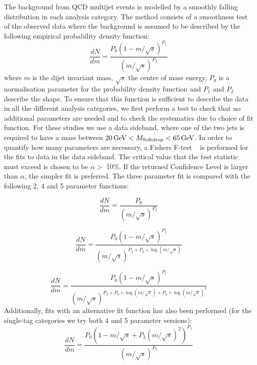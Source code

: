 The background from QCD multijet events is modelled by a smoothly falling distribution in each analysis category. The method consists of a smoothness test of the observed data where the background is assumed to be described by the following empirical probability density function:
\begin{equation}
\label{eq:dijet}
\frac{dN}{dm}= \frac{ P_0(1-m/\sqrt{s})^{P_1} } { (m/\sqrt{s})^{P_2} }
\end{equation}
where $m$ is the dijet invariant mass, $\sqrt{s}$ the centre of mass energy, $P_0$ is a normalisation parameter for the probability density function and $P_1$ and $ P_2$ describe the shape. To ensure that this function is sufficient to describe the data in all the different analysis categories, we first perform a test to check that no additional parameters are needed and to check the systematics due to choice of fit function. For these studies we use a data sideband, where one of the two jets is required to have a mass between $20 \,\text{Ge\hspace{-.08em}V} < M_{\rm{Softdrop}} < 65 \,\text{Ge\hspace{-.08em}V}$. In order to quantify how many parameters are necessary, a Fishers F-test ~\cite{RePEc:bla:istatr:v:80:y:2012:i:3:p:491-491} is performed for the fits to data in the data sideband. The critical value that the test statistic must exceed is chosen to be $\alpha > $ 10\%. If the returned Confidence Level is larger than $\alpha$, the simpler fit is preferred.
The three parameter fit is compared with the following 2, 4 and 5 parameter functions:

\begin{equation}
\label{eq:dijet2}
\frac{dN}{dm}= \frac{ P_0 } { (m/\sqrt{s})^{P_2} }
\end{equation}

\begin{equation}
\label{eq:dijet4}
\frac{dN}{dm}= \frac{ P_0(1-m/\sqrt{s})^{P_1} } { (m/\sqrt{s})^{P_2+P_3\times\log(m/\sqrt{s})} }
\end{equation}

\begin{equation}
\label{eq:dijet5}
\frac{dN}{dm}= \frac{ P_0(1-m/\sqrt{s})^{P_1} } { (m/\sqrt{s})^{P_2+P_3\times\log(m/\sqrt{s})+P_4\times\log(m/\sqrt{s})^2} }
\end{equation}
Additionally, fits with an alternative fit function has also been performed (for the single-tag categories we try both 4 and 5 parameter versions):
\begin{equation}
\label{eq:dijet6}
\frac{dN}{dm}= \frac{ P_0(1-m/\sqrt{s}+P_3(m/\sqrt{s})^2)^{P_1} } { (m/\sqrt{s})^{P_2} }
\end{equation}

